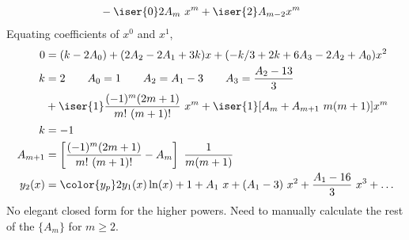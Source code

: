 \begin{enumerate}
\begin{align}
                    & - \iser{0}2 A_{m}\ x^{m} + \iser{2}A_{m-2} x^{m}
          \end{align}
          Equating coefficients of $ x^0 $ and $ x^1 $,
          \begin{align}
              0       & = (k - 2A_0) + (2A_2 - 2A_1 + 3k) x
              + (-k/3 + 2k + 6A_3 - 2A_2 + A_0) x^2                               \\
              k       & = 2 \qquad A_0 = 1 \qquad A_2 = A_1 - 3 \qquad
              A_3 = \frac{A_2 - 13}{3}                                            \\
                      & + \iser{1}\frac{(-1)^m (2m + 1)}
              {m!\ (m+1)!}\ x^m
              + \iser{1}[A_m + A_{m+1}\ m(m+1)] x^m                               \\
              k       & = -1                                                      \\
              A_{m+1} & = \left[ \frac{(-1)^{m} (2m+1)}{m!\ (m+1)!} - A_m \right]
              \ \frac{1}{m(m+1)}                                                  \\
              y_2(x)  & = {\color{y_p} 2y_1(x)\ln(x) + 1
              + A_1\ x + (A_1 - 3)\ x^2 + \frac{A_1 - 16}{3}\ x^3 + \dots}
          \end{align}
          No elegant closed form for the higher powers. Need to manually calculate the
          rest of the $ \{A_m\} $ for $ m \geq 2 $.


\end{enumerate}
